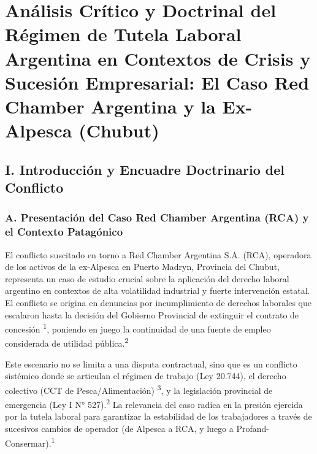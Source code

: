 \documentclass[]{article}
\author{}
\date{}
\begin{document}
\hypertarget{anuxe1lisis-cruxedtico-y-doctrinal-del-ruxe9gimen-de-tutela-laboral-argentina-en-contextos-de-crisis-y-sucesiuxf3n-empresarial-el-caso-red-chamber-argentina-y-la-ex-alpesca-chubut}{%
\section{Análisis Crítico y Doctrinal del Régimen de Tutela Laboral
Argentina en Contextos de Crisis y Sucesión Empresarial: El Caso Red
Chamber Argentina y la Ex-Alpesca
(Chubut)}\label{anuxe1lisis-cruxedtico-y-doctrinal-del-ruxe9gimen-de-tutela-laboral-argentina-en-contextos-de-crisis-y-sucesiuxf3n-empresarial-el-caso-red-chamber-argentina-y-la-ex-alpesca-chubut}}

\hypertarget{i.-introducciuxf3n-y-encuadre-doctrinario-del-conflicto}{%
\subsection{I. Introducción y Encuadre Doctrinario del
Conflicto}\label{i.-introducciuxf3n-y-encuadre-doctrinario-del-conflicto}}

\hypertarget{a.-presentaciuxf3n-del-caso-red-chamber-argentina-rca-y-el-contexto-pataguxf3nico}{%
\subsubsection{A. Presentación del Caso Red Chamber Argentina (RCA) y el
Contexto
Patagónico}\label{a.-presentaciuxf3n-del-caso-red-chamber-argentina-rca-y-el-contexto-pataguxf3nico}}

El conflicto suscitado en torno a Red Chamber Argentina S.A. (RCA),
operadora de los activos de la ex-Alpesca en Puerto Madryn, Provincia
del Chubut, representa un caso de estudio crucial sobre la aplicación
del derecho laboral argentino en contextos de alta volatilidad
industrial y fuerte intervención estatal. El conflicto se origina en
denuncias por incumplimiento de derechos laborales que escalaron hasta
la decisión del Gobierno Provincial de extinguir el contrato de
concesión \textsuperscript{1}, poniendo en juego la continuidad de una
fuente de empleo considerada de utilidad pública.\textsuperscript{2}

Este escenario no se limita a una disputa contractual, sino que es un
conflicto sistémico donde se articulan el régimen de trabajo (Ley
20.744), el derecho colectivo (CCT de Pesca/Alimentación)
\textsuperscript{3}, y la legislación provincial de emergencia (Ley I N°
527).\textsuperscript{2} La relevancia del caso radica en la presión
ejercida por la tutela laboral para garantizar la estabilidad de los
trabajadores a través de sucesivos cambios de operador (de Alpesca a
RCA, y luego a Profand-Consermar).\textsuperscript{1}
\end{document}
